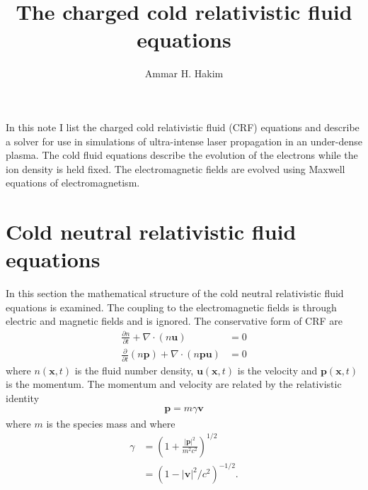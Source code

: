 \documentclass[11pt, reqno]{amsart}
\title{The charged cold relativistic fluid equations}%
\author{Ammar H. Hakim}%
\date{}
\newcommand{\pfrac}[2]{\frac{\partial #1}{\partial #2}}
\newcommand{\pfraca}[1]{\frac{\partial}{\partial #1}}
\newcommand{\mvec}[1]{\mathbf{#1}}
\theoremstyle{definition}
\begin{document}

\maketitle

In this note I list the charged cold relativistic fluid (CRF)
equations and describe a solver for use in simulations of
ultra-intense laser propagation in an under-dense plasma. The cold
fluid equations describe the evolution of the electrons while the ion
density is held fixed. The electromagnetic fields are evolved using
Maxwell equations of electromagnetism.

\section{Cold neutral relativistic fluid equations}

In this section the mathematical structure of the cold neutral
relativistic fluid equations is examined. The coupling to the
electromagnetic fields is through electric and magnetic fields and is
ignored. The conservative form of CRF are
\begin{align}
  \pfrac{n}{t} + \nabla\cdot(n\mvec{u}) &= 0 \\
  \pfraca{t}(n\mvec{p}) + \nabla\cdot (n\mvec{p}\mvec{u}) &= 0
\end{align}
where $n(\mvec{x},t)$ is the fluid number density,
$\mvec{u}(\mvec{x},t)$ is the velocity and $\mvec{p}(\mvec{x},t)$ is
the momentum. The momentum and velocity are related by the
relativistic identity
\begin{align}
  \mvec{p} = m\gamma \mvec{v}
\end{align}
where $m$ is the species mass and where
\begin{align}
  \gamma &= \left(1+\frac{|\mvec{p}|^2}{m^2c^2}\right)^{1/2} \\
  &= \left(1-|\mvec{v}|^2/c^2\right)^{-1/2}.
\end{align}
\end{document}
